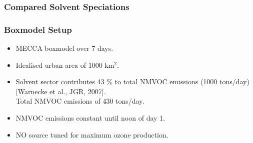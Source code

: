 \begin{frame}
    \frametitle{Compared Solvent Speciations}

    \vspace{-0.4cm}
    {
        \begin{table}%
            \begin{center}
                \small{}
            \end{center}
        \end{table}
    }
\end{frame}

\begin{frame}
    \frametitle{Boxmodel Setup}

    \vspace{-5mm}
    \begin{itemize}
        \item MECCA boxmodel over 7 days. \vspace{3mm}
        \item Idealised urban area of 1000 km$^2$. \vspace{3mm}
        \item Solvent sector contributes 43 \% to total NMVOC emissions (1000 tons/day) [Warnecke et al., JGR, 2007]. \\ Total NMVOC emissions of 430 tons/day. \vspace{3mm}
        \item NMVOC emissions constant until noon of day 1.\vspace{3mm}
        \item NO source tuned for maximum ozone production. 
    \end{itemize}
\end{frame}

